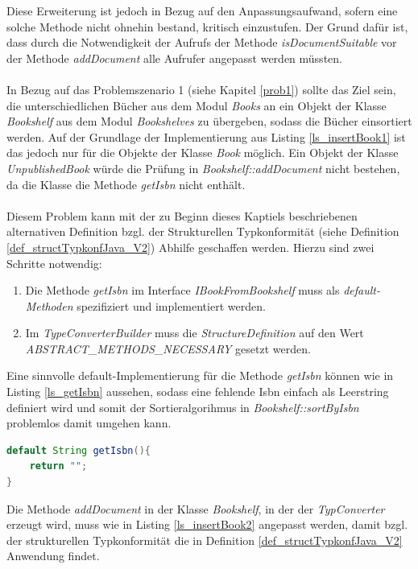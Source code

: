 \documentclass[11pt, 
ngerman,
doublespacing,
chapterinoneline, %
consistentlayout, %
]{scrartcl}
\begin{document}
Diese Erweiterung ist jedoch in Bezug auf den Anpassungsaufwand, sofern eine solche Methode nicht ohnehin bestand, kritisch einzustufen. Der Grund dafür ist, dass durch die Notwendigkeit der Aufrufs der Methode \emph{isDocumentSuitable} vor der Methode \emph{addDocument} alle Aufrufer angepasst werden müssten.\\\\
In Bezug auf das Problemszenario 1 (siehe Kapitel \ref{prob1}) sollte das Ziel sein, die unter\-schiedlichen Bücher aus dem Modul \emph{Books} an ein Objekt der Klasse  \emph{Bookshelf} aus dem Modul \emph{Bookshelves} zu übergeben, sodass die Bücher einsortiert werden. Auf der Grundlage der Implementierung aus Listing \ref{ls_insertBook1} ist das jedoch nur für die Objekte der Klasse \emph{Book} möglich. Ein Objekt der Klasse \emph{UnpublishedBook} würde die Prüfung in \emph{Bookshelf::addDocument} nicht bestehen, da die Klasse die Methode \emph{getIsbn} nicht enthält.\\\\
Diesem Problem kann mit der zu Beginn dieses Kaptiels beschriebenen alternativen Definition bzgl. der Strukturellen Typkonformität (siehe Definition \ref{def_structTypkonfJava_V2}) Abhilfe geschaffen werden. Hierzu sind zwei Schritte notwendig:
\begin{enumerate}
\item Die Methode \emph{getIsbn} im Interface \emph{IBookFromBookshelf} muss als \emph{default-Methoden} spezifiziert und implementiert werden.
\item Im \emph{TypeConverterBuilder} muss die 
\emph{StructureDefinition} auf den Wert \linebreak\emph{ABSTRACT\_METHODS\_NECESSARY} gesetzt werden.
\end{enumerate}
Eine sinnvolle default-Implementierung für die Methode \emph{getIsbn} können wie in Listing \ref{ls_getIsbn} aussehen, sodass eine fehlende Isbn einfach als Leerstring definiert wird und somit der Sortieralgorihmus in \emph{Bookshelf::sortByIsbn} problemlos damit umgehen kann.
\begin{lstlisting}[language=Java, label=ls_getIsbn, caption=Default-Implementierung getIsbn]
default String getIsbn(){
	return "";
}
\end{lstlisting}
Die Methode \emph{addDocument} in der Klasse \emph{Bookshelf}, in der der \emph{TypConverter} erzeugt wird, muss wie in Listing \ref{ls_insertBook2} angepasst werden, damit bzgl. der strukturellen Typkonformi\-tät die in Definition \ref{def_structTypkonfJava_V2} Anwendung findet.
\end{document}
